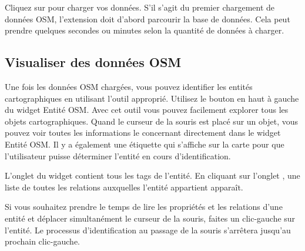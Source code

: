 Cliquez sur  pour charger vos données. S'il s'agit du premier chargement de données OSM, l'extension doit d'abord parcourir la base de données. Cela peut prendre quelques secondes ou minutes selon la quantité de données à charger.

\subsection{Visualiser des données OSM}

Une fois les données OSM chargées, vous pouvez identifier les entités cartographiques en utilisant l'outil approprié. Utilisez le bouton  en haut à gauche du widget Entité OSM. Avec cet outil vous pouvez facilement explorer tous les objets cartographiques. Quand le curseur de la souris est placé sur un objet, vous pouvez voir toutes les informations le concernant directement dans le widget Entité OSM. Il y a également une étiquette qui s'affiche sur la carte pour que l'utilisateur puisse déterminer l'entité en cours d'identification.

L'onglet  du widget contient tous les tags de l'entité. En cliquant sur l'onglet , une liste de toutes les relations auxquelles l'entité appartient apparaît.

Si vous souhaitez prendre le temps de lire les propriétés et les relations d'une entité et déplacer simultanément le curseur de la souris, faites un clic-gauche sur l'entité. Le processus d'identification au passage de la souris s'arrêtera jusqu'au prochain clic-gauche.

